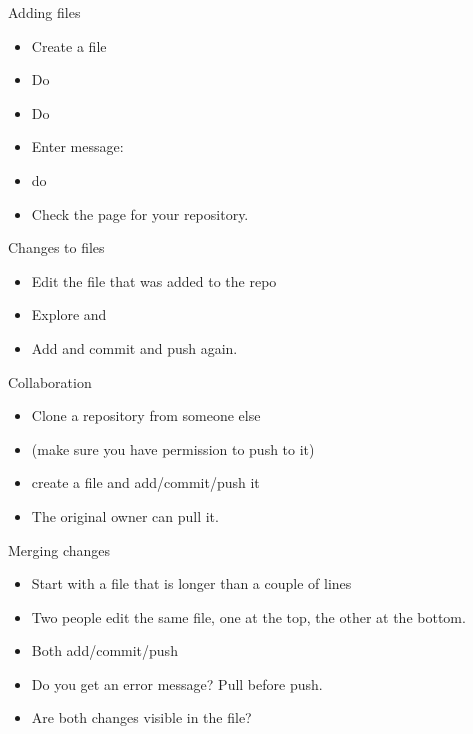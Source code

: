\documentclass[11pt,headernav]{beamer}
\begin{document}
\begin{numberedframe}{Adding files}
  \begin{itemize}
  \item Create a file
  \item Do 
  \item Do 
  \item Enter message: 
  \item do 
  \item Check the  page for your repository.
  \end{itemize}  
\end{numberedframe}

\begin{numberedframe}{Changes to files}
  \begin{itemize}
  \item Edit the file that was added to the repo
  \item Explore  and 
  \item Add and commit and push again.
  \end{itemize}
\end{numberedframe}

\begin{numberedframe}{Collaboration}
  \begin{itemize}
  \item Clone a repository from someone else
  \item (make sure you have permission to push to it)
  \item create a file and add/commit/push it
  \item The original owner can pull it.
  \end{itemize}
\end{numberedframe}

\begin{numberedframe}{Merging changes}
  \begin{itemize}
  \item Start with a file that is longer than a couple of lines
  \item Two people edit the same file, one at the top, the other at the bottom.
  \item Both add/commit/push
  \item Do you get an error message? Pull before push.
  \item Are both changes visible in the file?
  \end{itemize}
\end{numberedframe}
\end{document}
